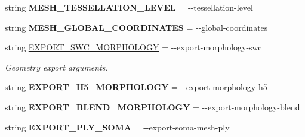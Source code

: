 \begin{DoxyCompactItemize}
\item 
string {\bfseries M\+E\+S\+H\+\_\+\+T\+E\+S\+S\+E\+L\+L\+A\+T\+I\+O\+N\+\_\+\+L\+E\+V\+EL} = \textquotesingle{}-\/-\/tessellation-\/level\textquotesingle{}\hypertarget{classmeshy_1_1neuromorphovis_1_1interface_1_1cli_1_1args_1_1Args_ac9dc8459994e1333495fc24f1fcfe9e7}{}\label{classmeshy_1_1neuromorphovis_1_1interface_1_1cli_1_1args_1_1Args_ac9dc8459994e1333495fc24f1fcfe9e7}

\item 
string {\bfseries M\+E\+S\+H\+\_\+\+G\+L\+O\+B\+A\+L\+\_\+\+C\+O\+O\+R\+D\+I\+N\+A\+T\+ES} = \textquotesingle{}-\/-\/global-\/coordinates\textquotesingle{}\hypertarget{classmeshy_1_1neuromorphovis_1_1interface_1_1cli_1_1args_1_1Args_ac4c2764ff0090f644174e10a76e1c471}{}\label{classmeshy_1_1neuromorphovis_1_1interface_1_1cli_1_1args_1_1Args_ac4c2764ff0090f644174e10a76e1c471}

\item 
string \hyperlink{classmeshy_1_1neuromorphovis_1_1interface_1_1cli_1_1args_1_1Args_a9bec3f44ead879671ccdfb73298b8392}{E\+X\+P\+O\+R\+T\+\_\+\+S\+W\+C\+\_\+\+M\+O\+R\+P\+H\+O\+L\+O\+GY} = \textquotesingle{}-\/-\/export-\/morphology-\/swc\textquotesingle{}
\begin{DoxyCompactList}\small\item\em Geometry export arguments. \end{DoxyCompactList}\item 
string {\bfseries E\+X\+P\+O\+R\+T\+\_\+\+H5\+\_\+\+M\+O\+R\+P\+H\+O\+L\+O\+GY} = \textquotesingle{}-\/-\/export-\/morphology-\/h5\textquotesingle{}\hypertarget{classmeshy_1_1neuromorphovis_1_1interface_1_1cli_1_1args_1_1Args_ad5f387ff27cf262700b8bd5d3773b87f}{}\label{classmeshy_1_1neuromorphovis_1_1interface_1_1cli_1_1args_1_1Args_ad5f387ff27cf262700b8bd5d3773b87f}

\item 
string {\bfseries E\+X\+P\+O\+R\+T\+\_\+\+B\+L\+E\+N\+D\+\_\+\+M\+O\+R\+P\+H\+O\+L\+O\+GY} = \textquotesingle{}-\/-\/export-\/morphology-\/blend\textquotesingle{}\hypertarget{classmeshy_1_1neuromorphovis_1_1interface_1_1cli_1_1args_1_1Args_abed50a6b7a541c10524383636e401511}{}\label{classmeshy_1_1neuromorphovis_1_1interface_1_1cli_1_1args_1_1Args_abed50a6b7a541c10524383636e401511}

\item 
string {\bfseries E\+X\+P\+O\+R\+T\+\_\+\+P\+L\+Y\+\_\+\+S\+O\+MA} = \textquotesingle{}-\/-\/export-\/soma-\/mesh-\/ply\textquotesingle{}\hypertarget{classmeshy_1_1neuromorphovis_1_1interface_1_1cli_1_1args_1_1Args_a646a58402fa72894235a6cc79e450690}{}\label{classmeshy_1_1neuromorphovis_1_1interface_1_1cli_1_1args_1_1Args_a646a58402fa72894235a6cc79e450690}


\end{DoxyCompactItemize}

